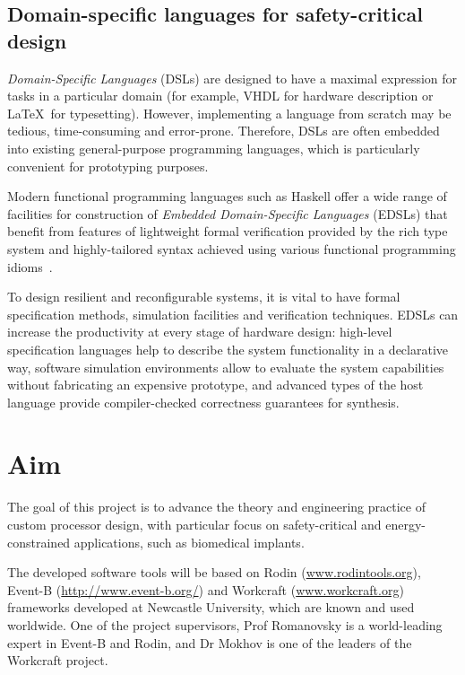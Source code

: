 \documentclass[10pt, a4paper]{article}
\begin{document}
\subsection{Domain-specific languages for safety-critical design}

\emph{Domain-Specific Languages} (DSLs) are designed to have a maximal 
expression for tasks in a particular domain (for example, VHDL for hardware
description or \LaTeX~for typesetting). However, implementing a language
from scratch may be tedious, time-consuming and error-prone. Therefore,
DSLs are often embedded into existing general-purpose programming languages,
which is particularly convenient for prototyping purposes.

Modern functional programming languages such as Haskell offer a wide range of
facilities for construction of \emph{Embedded Domain-Specific Languages} (EDSLs)
that benefit from features of lightweight formal verification provided by the
rich type system and highly-tailored syntax achieved using various functional
programming idioms~\cite{Hudak:1998:MDS:551789.853532}.

To design resilient and reconfigurable systems, it is vital to have formal
specification methods, simulation facilities and verification techniques.
EDSLs can increase the productivity at every stage of hardware design:
high-level specification languages help to describe the system functionality
in a declarative way, software simulation environments allow to evaluate the
system capabilities without fabricating an expensive prototype, and advanced
types of the host language provide compiler-checked correctness guarantees for
synthesis.

\section{Aim} 

The goal of this project is to advance the theory and
engineering practice of custom processor design, with
particular focus on safety-critical and energy-constrained
applications, such as biomedical implants.

The developed software tools will be based on Rodin 
(\url{www.rodintools.org}), Event-B (\url{http://www.event-b.org/}) and
Workcraft (\url{www.workcraft.org}) frameworks developed at Newcastle
University, which are known and used worldwide. One of the project supervisors,
Prof Romanovsky is a world-leading expert in Event-B and Rodin, and Dr Mokhov is
one of the leaders of the Workcraft project.
\end{document}
